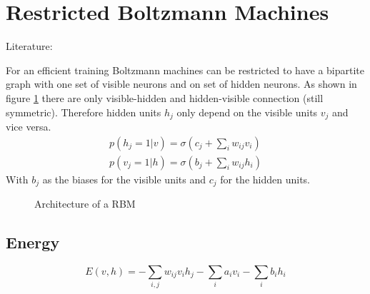 \section{Restricted Boltzmann Machines}\label{sec:rbm}
Literature: \cite{Bengio2009}

For an efficient training Boltzmann machines can be restricted to have a bipartite graph with one set of visible neurons and on set of hidden neurons. As shown in figure \ref{fig:rbm} there are only visible-hidden and hidden-visible connection (still symmetric). Therefore hidden units $h_j$ only depend on the visible units $v_j$ and vice versa.
\begin{align}
p(h_j=1|v) = \sigma(c_j + \sum_i w_{ij} v_i)\\
p(v_j=1|h) = \sigma(b_j + \sum_i w_{ij} h_i)
\end{align}
With $b_j$ as the biases for the visible units and $c_j$ for the hidden units.

\begin{figure}
\centering
{}
\caption{Architecture of a \gls{RBM}}
\label{fig:rbm}
\end{figure}

\subsection{Energy}
\begin{equation}\label{eq:rbm-energy}
E(v,h) = - \sum_{i,j} w_{ij} v_i h_j - \sum_i a_i v_i - \sum_i b_i h_i
\end{equation}


